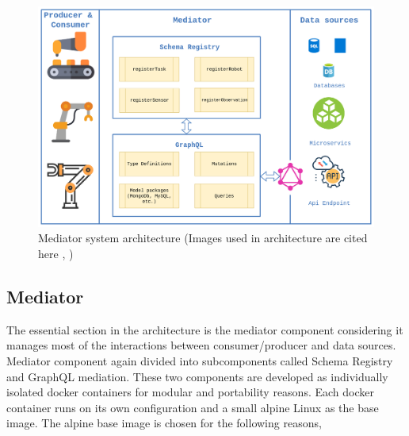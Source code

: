 	\begin{figure}[!htbp] 
		\begin{center}
			\includegraphics[scale=0.4]{./images/png/implementation/Architecture}	
			\caption{Mediator system architecture (Images used in architecture are cited here \cite{misc18} , \cite{misc17})}	
			\label{fig:architecture}	
		\end{center}
	\end{figure}
	
	
	\subsection{Mediator} 
	The essential section in the architecture is the mediator component considering it manages most of the interactions between consumer/producer and data sources. Mediator component again divided into subcomponents called Schema Registry and GraphQL mediation.  These two components are developed as individually isolated docker containers for modular and portability reasons. Each docker container runs on its own configuration and a small alpine Linux as the base image. The alpine base image is chosen for the following reasons, 
	
